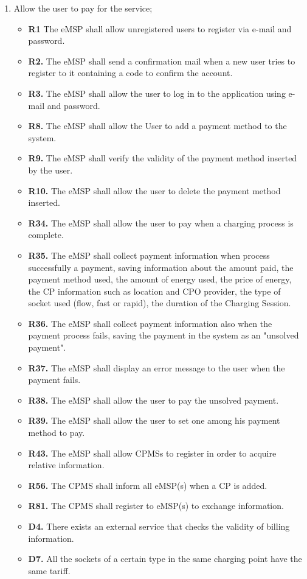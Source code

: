 \documentclass{Configuration_Files/PoliMi3i_thesis}
\begin{document}
\begin{enumerate}[label=\textbf{G\arabic*}]
    \item Allow the user to pay for the service;
        \begin{itemize}
            \item \textbf{R1} The eMSP shall allow unregistered users to register via e-mail and password.
            \item \textbf{R2.} The eMSP shall send a confirmation mail when a new user tries to register to it containing a code to confirm the account.
            \item \textbf{R3.} The eMSP shall allow the user to log in to the application using e-mail and password. 
            \item \textbf{R8.} The eMSP shall allow the User to add a payment method to the system.
            \item \textbf{R9.} The eMSP shall verify the validity of the payment method inserted by the user.
            \item \textbf{R10.} The eMSP shall allow the user to delete the payment method inserted.
            \item \textbf{R34.} The eMSP shall allow the user to pay when a charging process is complete.
            \item \textbf{R35.} The eMSP shall collect payment information when process successfully a payment, saving information about the amount paid, the payment method used, the amount of energy used, the price of energy,  the CP information such as location and CPO provider, the type of socket used (flow, fast or rapid), the duration of the Charging Session.
            \item \textbf{R36.} The eMSP shall collect payment information also when the payment process fails, saving the payment in the system as an "unsolved payment".
            \item \textbf{R37.} The eMSP shall display an error message to the user when the payment fails.
            \item \textbf{R38.} The eMSP shall allow the user to pay the unsolved payment.
            \item \textbf{R39.} The eMSP shall allow the user to set one among his payment method to pay.
            \item \textbf{R43.} The eMSP shall allow CPMSs to register in order to acquire relative information.
            \item \textbf{R56.} The CPMS shall inform all eMSP(s) when a CP is added.
            \item \textbf{R81.} The CPMS shall register to eMSP(s) to exchange information.
            \item \textbf{D4.} There exists an external service that checks the validity of billing information.
            \item \textbf{D7.} All the sockets of a certain type in the same charging point have the same tariff.
        \end{itemize}


\end{enumerate}
\end{document}
